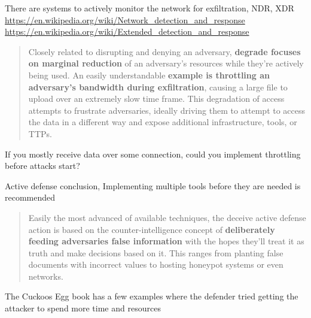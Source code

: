 \documentclass[Screen16to9,17pt]{foils}
\begin{document}
\begin{list2}
\item There are systems to actively monitor the network for exfiltration, NDR, XDR \\
\url{https://en.wikipedia.org/wiki/Network_detection_and_response}\\
\url{https://en.wikipedia.org/wiki/Extended_detection_and_response}
\end{list2}



\begin{quote}
Closely related to disrupting and denying an adversary, {\bf degrade focuses on marginal
reduction} of an adversary’s resources while they’re actively being used. An easily understandable {\bf example is throttling an adversary’s bandwidth during exfiltration}, causing a large file to upload over an extremely slow time frame. This degradation of access attempts to frustrate adversaries, ideally driving them to attempt to access the data in a different way and expose additional infrastructure, tools, or TTPs.
\end{quote}

\begin{list2}
\item If you mostly receive data over some connection, could you implement throttling before attacks start?
\end{list2}

\centerline{\large Active defense conclusion, Implementing multiple tools before they are needed is recommended}



\begin{quote}
Easily the most advanced of available techniques, the deceive active defense action
is based on the counter-intelligence concept of {\bf deliberately feeding adversaries false
information} with the hopes they’ll treat it as truth and make decisions based on it.
This ranges from planting false documents with incorrect values to hosting honeypot
systems or even networks.
\end{quote}

\begin{list2}
    \item The Cuckoos Egg book has a few examples where the defender tried getting the attacker to spend more time and resources
\end{list2}
\end{document}
